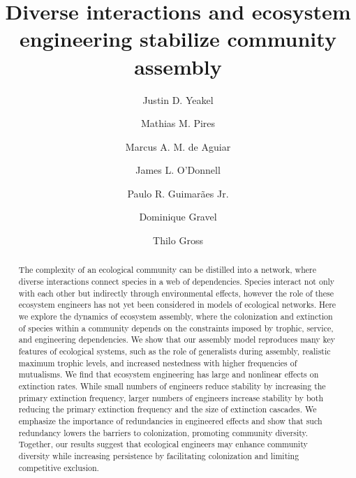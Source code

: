 \documentclass[twocolumn,preprintnumbers,amsmath,amssymb,superscriptaddress,linenumbers]{revtex4-1}
\begin{document}
\title{Diverse interactions and ecosystem engineering stabilize community assembly} %



\author{Justin D. Yeakel}  

\author{Mathias M. Pires} 

\author{Marcus A. M. de Aguiar} 

\author{James L. O'Donnell} 

\author{Paulo R. Guimar\~aes Jr.} 

\author{Dominique Gravel} 

\author{Thilo Gross} 

\begin{abstract}
  The complexity of an ecological community can be distilled into a network, where diverse interactions connect species in a web of dependencies. Species interact not only with each other but indirectly through environmental effects, however the role of these ecosystem engineers has not yet been considered in models of ecological networks. Here we explore the dynamics of ecosystem assembly, where the colonization and extinction of species within a community depends on the constraints imposed by trophic, service, and engineering dependencies. We show that our assembly model reproduces many key features of ecological systems, such as the role of generalists during assembly, realistic maximum trophic levels, and increased nestedness with higher frequencies of mutualisms. We find that ecosystem engineering has large and nonlinear effects on extinction rates. While small numbers of engineers reduce stability by increasing the primary extinction frequency, larger numbers of engineers increase stability by both reducing the primary extinction frequency and the size of extinction cascades. We emphasize the importance of redundancies in engineered effects and show that such redundancy lowers the barriers to colonization, promoting community diversity. Together, our results suggest that ecological engineers may enhance community diversity while increasing persistence by facilitating colonization and limiting competitive exclusion. 
\end{abstract}
\end{document}
